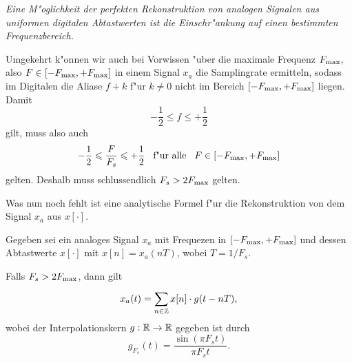 \emph{Eine M"oglichkeit der perfekten Rekonstruktion von analogen Signalen aus uniformen digitalen Abtastwerten ist die Einschr"ankung auf einen bestimmten Frequenzbereich.}

Umgekehrt k"onnen wir auch bei Vorwissen "uber die maximale Frequenz $F_{\rm max}$, also $F \in [-F_{\rm max},+F_{\rm max}]$ in einem Signal $x_a$ die Samplingrate ermitteln, sodass im Digitalen die Aliase $f + k$ f"ur $k \neq 0$ nicht im Bereich $[-F_{\rm max},+F_{\rm max}]$ liegen.
Damit
\[
    -\frac 12 \leqslant f \leqslant + \frac 12
\]
gilt, muss also auch
\[
    -\frac 12 \leqslant \frac{F}{F_s} \leqslant + \frac 12 {\hspace{3mm} \text{f"ur alle} \hspace{3mm}} F \in [-F_{\rm max},+F_{\rm max}]
\]
gelten.
Deshalb muss schlussendlich $F_s > 2 F_{\rm max}$ gelten.

Was nun noch fehlt ist eine analytische Formel f"ur die Rekonstruktion von dem Signal $x_a$ aus $x[\cdot]$.
\begin{Thm}\label{stm:sampling_theorem}
Gegeben sei ein analoges Signal $x_a$ mit Frequezen in $[-F_{\rm max},+F_{\rm max}]$ und dessen Abtastwerte $x[\cdot]$ mit $x[n] = x_a(nT)$, wobei $T = 1/F_s$.

Falls $F_s > 2 F_{\rm max}$, dann gilt
\begin{equation}\label{eq:sampling_theorem}
    x_a(t) = {\sum\limits_{n \in \mathbb{Z}}^{}{
        x[n] \cdot g(t - n T),
    }}
\end{equation}
wobei der Interpolationskern $g : \mathbb{R} \rightarrow \mathbb{R}$ gegeben ist durch
\[
g_{F_s}(t) = \frac{\sin(\pi F_s t)}{\pi F_s t}.
\]
\end{Thm}

